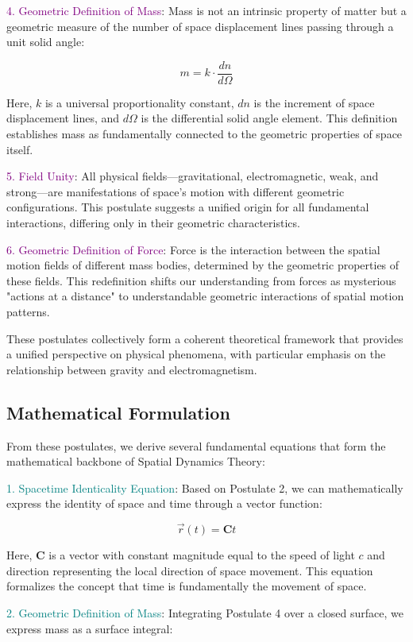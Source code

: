 \documentclass[nature,numbers]{article}
\newcommand{\tensor}[1]{\bm{#1}} %
\newcommand{\vect}[1]{\vec{#1}} %
\newcommand{\derivation}[1]{\textcolor{teal}{#1}} %
\newcommand{\postulate}[1]{\textcolor{purple}{#1}} %
\begin{document}
\postulate{4. Geometric Definition of Mass}: Mass is not an intrinsic property of matter but a geometric measure of the number of space displacement lines passing through a unit solid angle:

$$m = k \cdot \frac{dn}{d\Omega}$$ 

Here, $k$ is a universal proportionality constant, $dn$ is the increment of space displacement lines, and $d\Omega$ is the differential solid angle element. This definition establishes mass as fundamentally connected to the geometric properties of space itself.

\postulate{5. Field Unity}: All physical fields—gravitational, electromagnetic, weak, and strong—are manifestations of space's motion with different geometric configurations. This postulate suggests a unified origin for all fundamental interactions, differing only in their geometric characteristics.

\postulate{6. Geometric Definition of Force}: Force is the interaction between the spatial motion fields of different mass bodies, determined by the geometric properties of these fields. This redefinition shifts our understanding from forces as mysterious "actions at a distance" to understandable geometric interactions of spatial motion patterns.

These postulates collectively form a coherent theoretical framework that provides a unified perspective on physical phenomena, with particular emphasis on the relationship between gravity and electromagnetism.

\subsection{Mathematical Formulation}

From these postulates, we derive several fundamental equations that form the mathematical backbone of Spatial Dynamics Theory:

\derivation{1. Spacetime Identicality Equation}: Based on Postulate 2, we can mathematically express the identity of space and time through a vector function:

$$\vect{r}(t) = \tensor{C} t$$

Here, $\tensor{C}$ is a vector with constant magnitude equal to the speed of light $c$ and direction representing the local direction of space movement. This equation formalizes the concept that time is fundamentally the movement of space.

\derivation{2. Geometric Definition of Mass}: Integrating Postulate 4 over a closed surface, we express mass as a surface integral:
\end{document}
